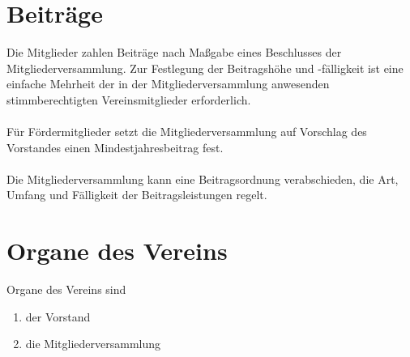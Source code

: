 \section{Beiträge}
Die Mitglieder zahlen Beiträge nach Maßgabe eines Beschlusses der
Mitgliederversammlung. Zur Festlegung der Beitragshöhe und -fälligkeit ist eine einfache Mehrheit der in der Mitgliederversammlung anwesenden stimmberechtigten Vereinsmitglieder erforderlich.\\
\\
Für Fördermitglieder setzt die Mitgliederversammlung auf Vorschlag des Vorstandes einen Mindestjahresbeitrag fest.\\
\\
Die Mitgliederversammlung kann eine Beitragsordnung verabschieden, die Art, Umfang und Fälligkeit der Beitragsleistungen regelt.

\section{Organe des Vereins}
Organe des Vereins sind
\begin{enumerate}[label={(\alph*)}]
  \item der Vorstand
  \item die Mitgliederversammlung
\end{enumerate} 

